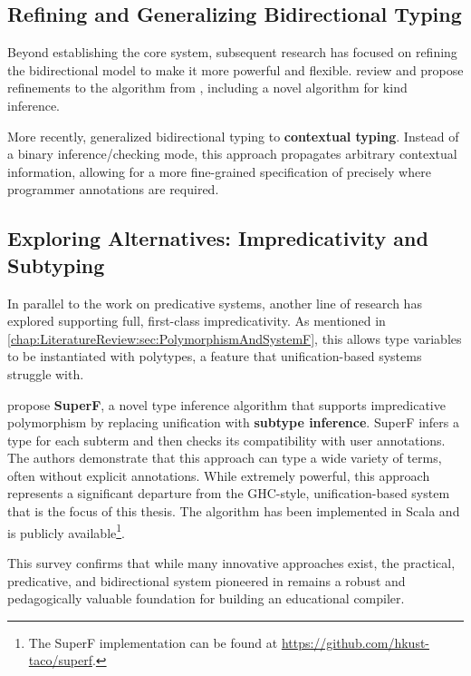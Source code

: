 \subsection{Refining and Generalizing Bidirectional Typing}

Beyond establishing the core system, subsequent research has focused on refining the bidirectional model to make it more powerful and flexible. \citeauthor{xie-higher-rank} \cite{xie-higher-rank} review and propose refinements to the algorithm from \cite{dunfield-complete-2013}, including a novel algorithm for kind inference.

More recently, \citeauthor{xue-contextual-2024} \cite{xue-contextual-2024} generalized bidirectional typing to \textbf{contextual typing}. Instead of a binary inference/checking mode, this approach propagates arbitrary contextual information, allowing for a more fine-grained specification of precisely where programmer annotations are required.

\subsection{Exploring Alternatives: Impredicativity and Subtyping}

In parallel to the work on predicative systems, another line of research has explored supporting full, first-class impredicativity. As mentioned in \cref{chap:LiteratureReview:sec:PolymorphismAndSystemF}, this allows type variables to be instantiated with polytypes, a feature that unification-based systems struggle with.

\citeauthor{parreaux-when-2024} \cite{parreaux-when-2024} propose \textbf{SuperF}, a novel type inference algorithm that supports impredicative polymorphism by replacing unification with \textbf{subtype inference}. SuperF infers a type for each subterm and then checks its compatibility with user annotations. The authors demonstrate that this approach can type a wide variety of terms, often without explicit annotations. While extremely powerful, this approach represents a significant departure from the GHC-style, unification-based system that is the focus of this thesis. The algorithm has been implemented in Scala and is publicly available\footnote{The SuperF implementation can be found at \url{https://github.com/hkust-taco/superf}.}.

This survey confirms that while many innovative approaches exist, the practical, predicative, and bidirectional system pioneered in \cite{jones-practical-2007} remains a robust and pedagogically valuable foundation for building an educational compiler.